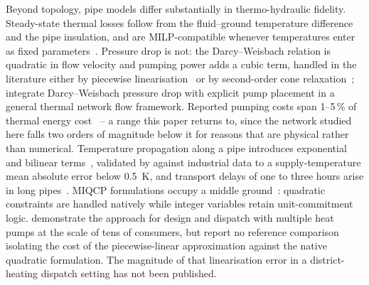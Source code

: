 Beyond topology, pipe models differ substantially in thermo-hydraulic fidelity.
Steady-state thermal losses follow from the fluid--ground temperature difference and the
pipe insulation, and are MILP-compatible whenever temperatures enter as fixed
parameters~\cite{Frederiksen2013}. Pressure drop is not: the Darcy--Weisbach relation is
quadratic in flow velocity and pumping power adds a cubic term, handled in the literature
either by piecewise linearisation~\cite{Bordin2016} or by second-order cone
relaxation~\cite{Blommaert2020}; \citet{Hari2024} integrate Darcy--Weisbach pressure drop
with explicit pump placement in a general thermal network flow framework. Reported pumping
costs span 1--5\,\% of thermal energy cost~\cite{Frederiksen2013} -- a range this paper
returns to, since the network studied here falls two orders of magnitude below it for
reasons that are physical rather than numerical. Temperature propagation along a pipe
introduces exponential and bilinear terms~\cite{vanderHeijde2017}, validated by
\citet{Maldonado2024} against industrial data to a supply-temperature mean absolute error
below \SI{0.5}{\kelvin}, and transport delays of one to three hours arise in long
pipes~\cite{Giraud2015}. MIQCP formulations occupy a middle ground~\cite{Ommen2016}:
quadratic constraints are handled natively while integer variables retain
unit-commitment logic. \citet{Hering2021} demonstrate the approach for design and
dispatch with multiple heat pumps at the scale of tens of consumers, but report no
reference comparison isolating the cost of the piecewise-linear approximation against the
native quadratic formulation. The magnitude of that linearisation error in a
district-heating dispatch setting has not been published.

